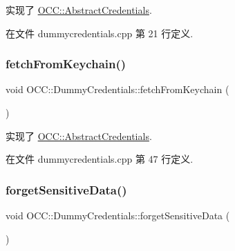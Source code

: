 实现了 \hyperlink{class_o_c_c_1_1_abstract_credentials_a47219fcdd7ecc614803d024c361b9c16}{O\+C\+C\+::\+Abstract\+Credentials}.



在文件 dummycredentials.\+cpp 第 21 行定义.

\mbox{\label{class_o_c_c_1_1_dummy_credentials_a4b73e13551260fbd397fc300c833c5cc}} 
\subsubsection{\texorpdfstring{fetch\+From\+Keychain()}{fetchFromKeychain()}}
{\footnotesize\ttfamily void O\+C\+C\+::\+Dummy\+Credentials\+::fetch\+From\+Keychain (\begin{DoxyParamCaption}{ }\end{DoxyParamCaption})\hspace{0.3cm}{\ttfamily [virtual]}}



实现了 \hyperlink{class_o_c_c_1_1_abstract_credentials_aac58b02f74811eeedb0fd944bf8a20c3}{O\+C\+C\+::\+Abstract\+Credentials}.



在文件 dummycredentials.\+cpp 第 47 行定义.

\mbox{\label{class_o_c_c_1_1_dummy_credentials_abbe85cf8654a6828a8a86639c40b1d72}} 
\subsubsection{\texorpdfstring{forget\+Sensitive\+Data()}{forgetSensitiveData()}}
{\footnotesize\ttfamily void O\+C\+C\+::\+Dummy\+Credentials\+::forget\+Sensitive\+Data (\begin{DoxyParamCaption}{ }\end{DoxyParamCaption})\hspace{0.3cm}{\ttfamily [virtual]}}

